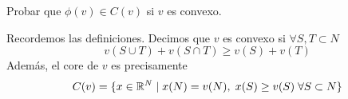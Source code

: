 \documentclass[twoside]{article}
\begin{document}
\newpage

\begin{ejercicio}{4}
Probar que $\phi(v)\in C(v)$ si $v$ es convexo.
\end{ejercicio}
\begin{solucion}
Recordemos las definiciones. Decimos que $v$ es convexo si $\forall S,T\subset N$
$$
v(S\cup T) + v(S\cap T) \geq v(S) + v(T) 
$$
Además, el core de $v$ es precisamente
$$
C(v) = \{x\in \mathbb{R}^{N}\mid x(N) = v(N), \; x(S) \geq v(S)\; \forall S \subset N\}
$$
\end{solucion}
\end{document}
